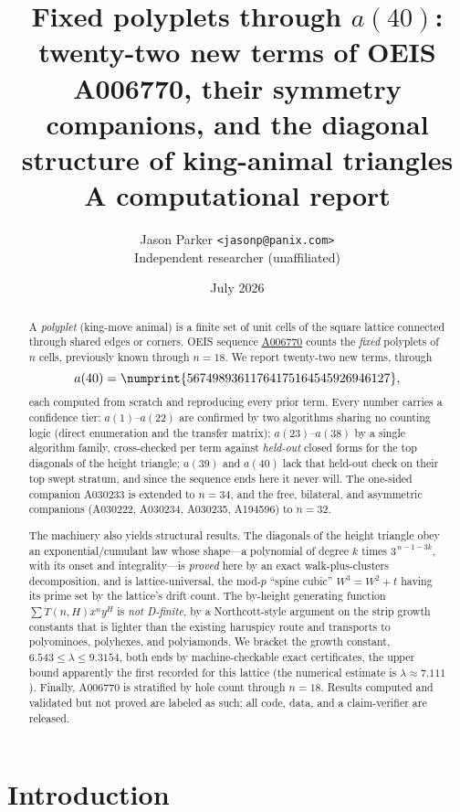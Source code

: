 \documentclass[11pt]{article}
\title{\textbf{Fixed polyplets through $a(40)$: twenty-two new terms of OEIS
A006770, their symmetry companions, and the diagonal structure of king-animal
triangles}\\[4pt]
\large A computational report}
\author{Jason Parker \texttt{<jasonp@panix.com>}\\[2pt]
\small Independent researcher (unaffiliated)}
\date{July 2026}
\newcommand{\num}[1]{\numprint{#1}}
\begin{document}
\maketitle

\begin{abstract}
\noindent
A \emph{polyplet} (king-move animal) is a finite set of unit cells of the square
lattice connected through shared edges or corners. OEIS sequence
\href{https://oeis.org/A006770}{A006770} counts the \emph{fixed} polyplets of $n$
cells, previously known through $n=18$. We report twenty-two new terms, through
\[
  a(40) = \num{56749893611764175164545926946127},
\]
each computed from scratch and reproducing every prior term. Every number
carries a confidence tier: $a(1)$--$a(22)$ are confirmed by two
algorithms sharing no counting logic (direct enumeration and the transfer
matrix); $a(23)$--$a(38)$ by a single algorithm family, cross-checked per
term against \emph{held-out} closed forms for the top diagonals of the
height triangle; $a(39)$ and $a(40)$ lack that held-out check on their top
swept stratum, and since the sequence ends here it never will.
The one-sided companion A030233 is extended to
$n=34$, and the free, bilateral, and asymmetric companions (A030222,
A030234, A030235, A194596) to $n=32$.

The machinery also yields structural results. The diagonals of the height
triangle obey an exponential/cumulant law whose shape---a polynomial of
degree $k$ times $3^{\,n-1-3k}$, with its onset and integrality---is
\emph{proved} here by an exact walk-plus-clusters decomposition, and is
lattice-universal, the mod-$p$ ``spine cubic'' $W^3=W^2+t$ having its prime
set by the lattice's drift count.
The by-height generating function $\sum T(n,H)x^ny^H$ is \emph{not
D-finite}, by a Northcott-style argument on the strip growth constants that
is lighter than the existing haruspicy route and transports to polyominoes,
polyhexes, and polyiamonds. We bracket the growth constant,
$6.543\le\lambda\le9.3154$, both ends by machine-checkable exact
certificates, the upper bound apparently the first recorded for this
lattice (the numerical estimate is $\lambda\approx7.111$). Finally, A006770
is stratified by hole count through $n=18$. Results computed and validated but not
proved are labeled as such; all code, data, and a claim-verifier are
released.
\end{abstract}

\section{Introduction}
\label{sec:intro}
\end{document}
